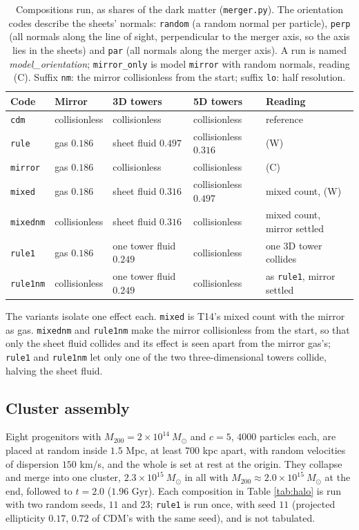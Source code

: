 \documentclass[11pt]{article}
\theoremstyle{definition}
\newcommand{\Msun}{M_{\odot}}
\newcommand{\file}[1]{\texttt{#1}}
\begin{document}
\begin{table}[htbp]\centering\small
\begin{tabular}{@{}lllll@{}}
\toprule
Code & Mirror & 3D towers & 5D towers & Reading \\
\midrule
\texttt{cdm} & collisionless & collisionless & collisionless & reference \\
\texttt{rule} & gas $0.186$ & sheet fluid $0.497$ & collisionless $0.316$ & (W) \\
\texttt{mirror} & gas $0.186$ & collisionless & collisionless & (C) \\
\texttt{mixed} & gas $0.186$ & sheet fluid $0.316$ & collisionless $0.497$ & mixed count, (W) \\
\texttt{mixednm} & collisionless & sheet fluid $0.316$ & collisionless & mixed count, mirror settled \\
\texttt{rule1} & gas $0.186$ & one tower fluid $0.249$ & collisionless & one 3D tower collides \\
\texttt{rule1nm} & collisionless & one tower fluid $0.249$ & collisionless & as \texttt{rule1}, mirror settled \\
\bottomrule
\end{tabular}
\caption{Compositions run, as shares of the dark matter (\file{merger.py}). The orientation codes describe the sheets' normals: \texttt{random} (a random normal per particle), \texttt{perp} (all normals along the line of sight, perpendicular to the merger axis, so the axis lies in the sheets) and \texttt{par} (all normals along the merger axis). A run is named \emph{model\_orientation}; \texttt{mirror\_only} is model \texttt{mirror} with random normals, reading (C). Suffix \texttt{nm}: the mirror collisionless from the start; suffix \texttt{lo}: half resolution.}
\label{tab:comps}
\end{table}

The variants isolate one effect each. \texttt{mixed} is T14's mixed count with the mirror as gas. \texttt{mixednm} and \texttt{rule1nm} make the mirror collisionless from the start, so that only the sheet fluid collides and its effect is seen apart from the mirror gas's; \texttt{rule1} and \texttt{rule1nm} let only one of the two three-dimensional towers collide, halving the sheet fluid.

\subsection{Cluster assembly}

Eight progenitors with $M_{200} = 2 \times 10^{14}\ \Msun$ and $c = 5$, $4000$ particles each, are placed at random inside $1.5$ Mpc, at least $700$ kpc apart, with random velocities of dispersion $150$ km/s, and the whole is set at rest at the origin. They collapse and merge into one cluster, $2.3 \times 10^{15}\ \Msun$ in all with $M_{200} \approx 2.0 \times 10^{15}\ \Msun$ at the end, followed to $t = 2.0$ ($1.96$ Gyr). Each composition in Table \ref{tab:halo} is run with two random seeds, $11$ and $23$; \texttt{rule1} is run once, with seed $11$ (projected ellipticity $0.17$, $0.72$ of CDM's with the same seed), and is not tabulated.
\end{document}
